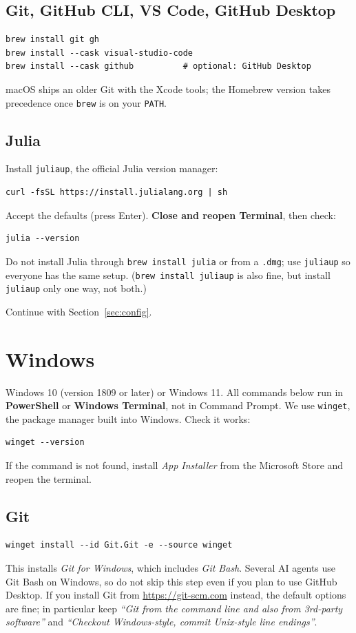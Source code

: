 \documentclass[11pt,a4paper]{article}
\newcommand{\cmd}[1]{\texttt{#1}}
\begin{document}
\subsection{Git, GitHub CLI, VS Code, GitHub Desktop}\label{sec:mac-tools}
\begin{lstlisting}
brew install git gh
brew install --cask visual-studio-code
brew install --cask github          # optional: GitHub Desktop
\end{lstlisting}
macOS ships an older Git with the Xcode tools; the Homebrew version takes precedence
once \cmd{brew} is on your \cmd{PATH}.

\subsection{Julia}
Install \cmd{juliaup}, the official Julia version manager:
\begin{lstlisting}
curl -fsSL https://install.julialang.org | sh
\end{lstlisting}
Accept the defaults (press Enter). \textbf{Close and reopen Terminal}, then check:
\begin{lstlisting}
julia --version
\end{lstlisting}
Do not install Julia through \cmd{brew install julia} or from a \cmd{.dmg}; use
\cmd{juliaup} so everyone has the same setup. (\cmd{brew install juliaup} is also fine,
but install \cmd{juliaup} only one way, not both.)

Continue with Section~\ref{sec:config}.

\section{Windows}\label{sec:windows}

Windows 10 (version 1809 or later) or Windows 11. All commands below run in
\textbf{PowerShell} or \textbf{Windows Terminal}, not in Command Prompt.
We use \cmd{winget}, the package manager built into Windows. Check it works:
\begin{lstlisting}
winget --version
\end{lstlisting}
If the command is not found, install \emph{App Installer} from the Microsoft Store
and reopen the terminal.

\subsection{Git}
\begin{lstlisting}
winget install --id Git.Git -e --source winget
\end{lstlisting}
This installs \emph{Git for Windows}, which includes \emph{Git Bash}. Several AI agents
use Git Bash on Windows, so do not skip this step even if you plan to use GitHub Desktop.
If you install Git from \url{https://git-scm.com} instead, the default options are
fine; in particular keep \emph{``Git from the command line and also from 3rd-party
software''} and \emph{``Checkout Windows-style, commit Unix-style line endings''}.
\end{document}
